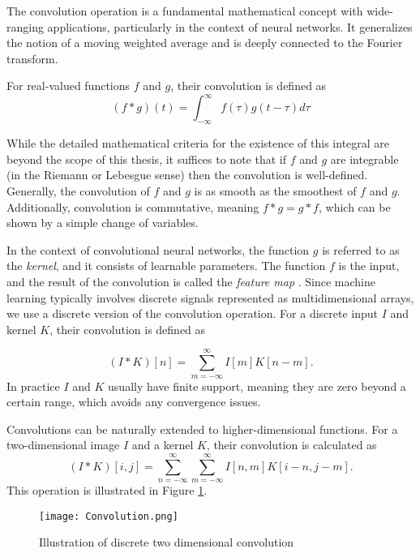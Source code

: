 \documentclass[../../thesis.tex]{subfiles}
\begin{document}
The convolution operation is a fundamental mathematical concept with wide-ranging applications, particularly in the context of neural networks. It generalizes the notion of a moving weighted average and is deeply connected to the Fourier transform.\newline

For real-valued functions $f$ and $g$, their convolution is defined as
\begin{equation}
    (f*g)(t) = \int_{-\infty}^{\infty} f(\tau)g(t-\tau) d\tau
\end{equation}

While the detailed mathematical criteria for the existence of this integral are beyond the scope of this thesis, it suffices to note that if $f$ and $g$ are integrable (in the Riemann or Lebesgue sense) then the convolution is well-defined. Generally, the convolution of $f$ and $g$ is as smooth as the smoothest of $f$ and $g$. Additionally, convolution is commutative, meaning $f*g = g*f$, which can be shown by a simple change of variables. \newline


In the context of convolutional neural networks, the function $g$ is referred to as the \textit{kernel}, and it consists of learnable parameters. The function $f$ is the input, and the result of the convolution is called the \textit{feature map} \cite{deeplearningbook}. Since machine learning typically involves discrete signals represented as multidimensional arrays, we use a discrete version of the convolution operation. For a discrete input $I$ and kernel $K$, their convolution is defined as

\begin{equation}
    (I*K)[n] = \sum_{m=-\infty}^{\infty} I[m]K[n-m].
\end{equation}
In practice $I$ and $K$ usually have finite support, meaning they are zero beyond a certain range, which avoids any convergence issues.\newline

Convolutions can be naturally extended to higher-dimensional functions. For a two-dimensional image $I$ and a kernel $K$, their convolution is calculated as 
\begin{equation}
    (I*K)[i,j] = \sum_{n=-\infty}^{\infty}\sum_{m=-\infty}^{\infty} I[n,m]K[i - n,j - m]. 
\end{equation}
This operation is illustrated in Figure \ref{fig:Convolution}.
\begin{figure}[h]
    \texttt{[image: Convolution.png]}
    \centering    
    \caption{Illustration of discrete two dimensional convolution}
    \label{fig:Convolution}
\end{figure}
\end{document}
